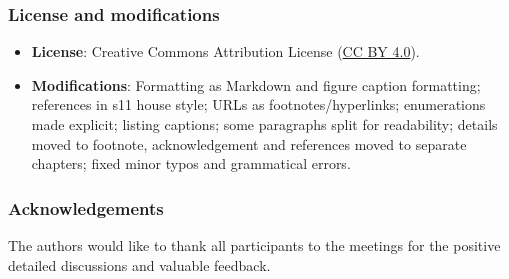 \subsubsection*{License and modifications}

\begin{itemize}
\tightlist
\item
  \textbf{License}: Creative Commons Attribution License
  (\href{https://spdx.org/licenses/CC-BY-4.0}{CC BY 4.0}).
\item
  \textbf{Modifications}: Formatting as Markdown and figure caption formatting; references in s11 house style; URLs as footnotes/hyperlinks; enumerations made explicit; listing captions; some paragraphs split for readability; details moved to footnote, acknowledgement and references moved to separate chapters; fixed minor typos and grammatical errors.
\end{itemize}


\subsubsection*{Acknowledgements}

The authors would like to thank all participants to the 
meetings for the positive detailed discussions and
valuable feedback.

